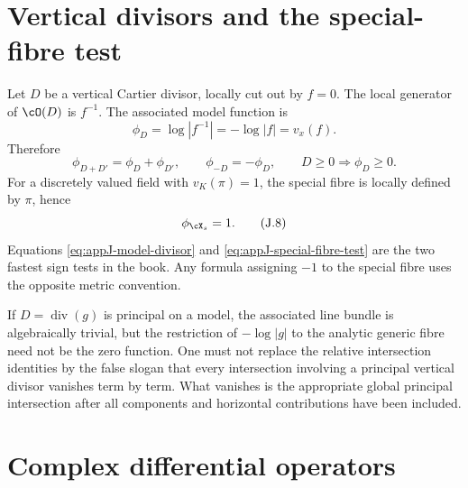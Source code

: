 \section{Vertical divisors and the special-fibre test}
\label{sec:appJ-model-functions}

Let \(D\) be a vertical Cartier divisor, locally cut out by \(f=0\).  The
local generator of \(\cO(D)\) is \(f^{-1}\).  The associated model function
is
\begin{equation*}
 \phi_D=\log|f^{-1}|=-\log|f|=v_x(f).
 \tag{J.7}\label{eq:appJ-model-divisor}
\end{equation*}
Therefore
\[
 \phi_{D+D'}=\phi_D+\phi_{D'},
 \qquad
 \phi_{-D}=-\phi_D,
 \qquad
 D\geq0\Longrightarrow \phi_D\geq0.
\]
For a discretely valued field with \(v_K(\pi)=1\), the special fibre is
locally defined by \(\pi\), hence
\begin{equation*}
 \phi_{\cX_s}=1.
 \tag{J.8}\label{eq:appJ-special-fibre-test}
\end{equation*}
Equations \eqref{eq:appJ-model-divisor} and
\eqref{eq:appJ-special-fibre-test} are the two fastest sign tests in the
book.  Any formula assigning \(-1\) to the special fibre uses the opposite
metric convention.

If \(D=\operatorname{div}(g)\) is principal on a model, the associated
line bundle is algebraically trivial, but the restriction of
\(-\log|g|\) to the analytic generic fibre need not be the zero function.
One must not replace the relative intersection identities by the false
slogan that every intersection involving a principal vertical divisor
vanishes term by term.  What vanishes is the appropriate global principal
intersection after all components and horizontal contributions have been
included.

\section{Complex differential operators}
\label{sec:appJ-complex-ddc}

